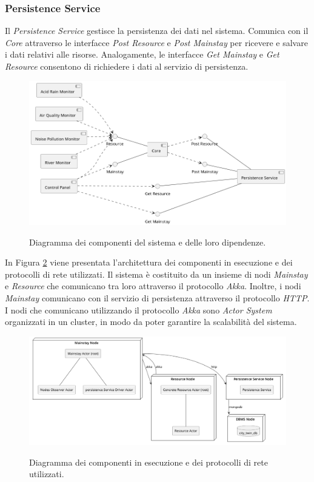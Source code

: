 \documentclass[12pt]{article}
\begin{document}
\subsubsection{Persistence Service}
Il \textit{Persistence Service} gestisce la persistenza dei dati nel sistema. Comunica con il \textit{Core} attraverso le interfacce \textit{Post Resource} e \textit{Post Mainstay} per ricevere e salvare i dati relativi alle risorse. Analogamente, le interfacce \textit{Get Mainstay} e \textit{Get Resource }consentono di richiedere i dati al servizio di persistenza.

\begin{figure}[H]
    \caption{Diagramma dei componenti del sistema e delle loro dipendenze.}
    \includegraphics[width=\textwidth]{../assets/images/core-component-diagram.png}
    \label{fig:core-component-diagram}
\end{figure}

In Figura \ref{fig:nodes-component-diagram} viene presentata l'architettura dei componenti in esecuzione e dei protocolli di rete utilizzati. Il sistema è costituito da un insieme di nodi \textit{Mainstay} e \textit{Resource} che comunicano tra loro attraverso il protocollo \textit{Akka}. Inoltre, i nodi \textit{Mainstay} comunicano con il servizio di persistenza attraverso il protocollo \textit{HTTP}.
I nodi che comunicano utilizzando il protocollo \textit{Akka} sono \textit{Actor System} organizzati in un cluster, in modo da poter garantire la scalabilità del sistema.

\begin{figure}[H]
    \caption{Diagramma dei componenti in esecuzione e dei protocolli di rete utilizzati.}
    \includegraphics[width=\textwidth]{../assets/images/nodes-component-diagram.png}
    \label{fig:nodes-component-diagram}
\end{figure}
\end{document}
